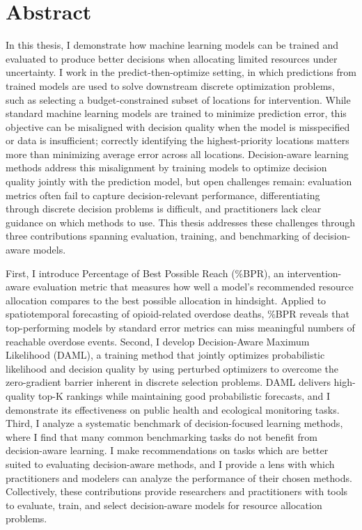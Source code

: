 \chapter*{Abstract}
In this thesis, I demonstrate how machine learning models can be trained and evaluated to produce better decisions when allocating limited resources under uncertainty.
I work in the predict-then-optimize setting, in which predictions from trained models are used to solve downstream discrete optimization problems, such as selecting a budget-constrained subset of locations for intervention.
While standard machine learning models are trained to minimize prediction error, this objective can be misaligned with decision quality when the model is misspecified or data is insufficient; correctly identifying the highest-priority locations matters more than minimizing average error across all locations.
Decision-aware learning methods address this misalignment by training models to optimize decision quality jointly with the prediction model, but open challenges remain: evaluation metrics often fail to capture decision-relevant performance, differentiating through discrete decision problems is difficult, and practitioners lack clear guidance on which methods to use. 
This thesis addresses these challenges through three contributions spanning evaluation, training, and benchmarking of decision-aware models.

First, I introduce Percentage of Best Possible Reach (\%BPR), an intervention-aware evaluation metric that measures how well a model's recommended resource allocation compares to the best possible allocation in hindsight.
Applied to spatiotemporal forecasting of opioid-related overdose deaths, \%BPR reveals that top-performing models by standard error metrics can miss meaningful numbers of reachable overdose events.
Second, I develop Decision-Aware Maximum Likelihood (DAML), a training method that jointly optimizes probabilistic likelihood and decision quality by using perturbed optimizers to overcome the zero-gradient barrier inherent in discrete selection problems.
DAML delivers high-quality top-K rankings while maintaining good probabilistic forecasts, and I demonstrate its effectiveness on public health and ecological monitoring tasks.
Third, I analyze a systematic benchmark of decision-focused learning methods, where I find that many common benchmarking tasks do not benefit from decision-aware learning. 
I make recommendations on tasks which are better suited to evaluating decision-aware methods, and I provide a lens with which practitioners and modelers can analyze the performance of their chosen methods.
Collectively, these contributions provide researchers and practitioners with tools to evaluate, train, and select decision-aware models for resource allocation problems.